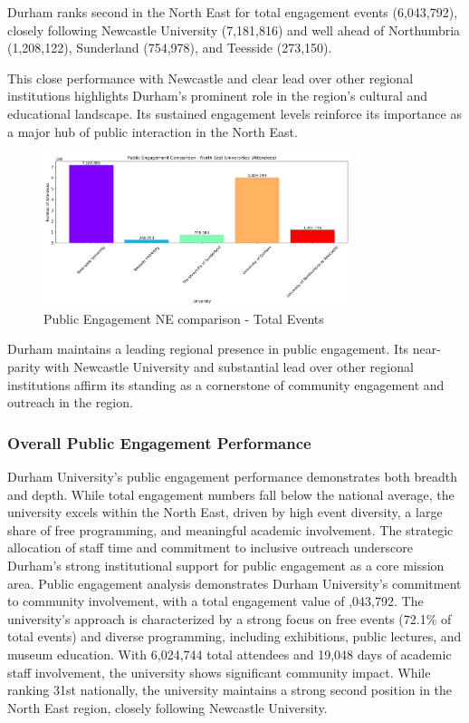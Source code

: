 \documentclass[journal,onecolumn, 10pt,draftclsnofoot]{IEEEtran}
\begin{document}
Durham ranks second in the North East for total engagement events (6,043,792), closely following Newcastle University (7,181,816) and well ahead of Northumbria (1,208,122), Sunderland (754,978), and Teesside (273,150).

This close performance with Newcastle and clear lead over other regional institutions highlights Durham's prominent role in the region's cultural and educational landscape. Its sustained engagement levels reinforce its importance as a major hub of public interaction in the North East.

\begin{figure}[h]
\centering
\includegraphics[width=0.8\textwidth]{Fig/figure34.ne_comparison.png}
\caption{Public Engagement NE comparison - Total Events}
\label{fig:ne-comparison}
\end{figure}

Durham maintains a leading regional presence in public engagement. Its near-parity with Newcastle University and substantial lead over other regional institutions affirm its standing as a cornerstone of community engagement and outreach in the region.
\subsubsection{Overall Public Engagement Performance}

Durham University's public engagement performance demonstrates both breadth and depth. While total engagement numbers fall below the national average, the university excels within the North East, driven by high event diversity, a large share of free programming, and meaningful academic involvement. The strategic allocation of staff time and commitment to inclusive outreach underscore Durham's strong institutional support for public engagement as a core mission area. Public engagement analysis demonstrates Durham University's commitment to community involvement, with a total engagement value of ,043,792. The university's approach is characterized by a strong focus on free events (72.1\% of total events) and diverse programming, including exhibitions, public lectures, and museum education. With 6,024,744 total attendees and 19,048 days of academic staff involvement, the university shows significant community impact. While ranking 31st nationally, the university maintains a strong second position in the North East region, closely following Newcastle University.
\end{document}

